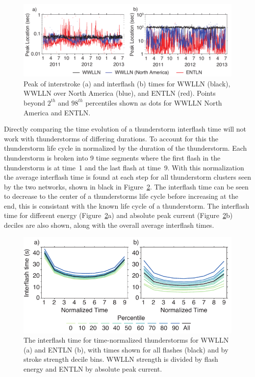 \begin{figure}[ht!]
   \centering
   \includegraphics[scale=1]{thunderstorm/Figures/interflashStability.pdf}
   \caption{Peak of interstroke (a) and interflash (b) times for WWLLN (black), WWLLN over North America (blue), and ENTLN (red).
          Points beyond $2^{th}$ and $98^{th}$ percentiles shown as dots for WWLLN North America and ENTLN.}
   \label{stability}
\end{figure}

Directly comparing the time evolution of a thunderstorm interflash time will not work with thunderstorms of differing durations.
To account for this the thunderstorm life cycle in normalized by the duration of the thunderstorm.
Each thunderstorm is broken into 9 time segments where the first flash in the thunderstorm is at time~1 and the last flash at time~9.
With this normalization the average interflash time is found at each step for all thunderstorm clusters seen by the two networks, shown in black in Figure~\ref{timerate}.
The interflash time can be seen to decrease to the center of a thunderstorms life cycle before increasing at the end, this is consistant with the known life cycle of a thunderstorm.
The interflash time for different energy (Figure~\ref{timerate}a) and absolute peak current (Figure~\ref{timerate}b) deciles are also shown, along with the overall average interflash times.

\begin{figure}[ht!]
   \centering
   \includegraphics[scale=1]{thunderstorm/Figures/stormTimeRate.pdf}
   \caption{The interflash time for time-normalized thunderstorms for WWLLN (a) and ENTLN (b), with times shown for all flashes (black) and by stroke strength decile bins.
     WWLLN strength is divided by flash energy and ENTLN by absolute peak current.}
   \label{timerate}
\end{figure}

